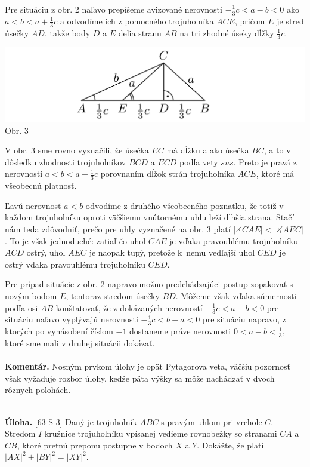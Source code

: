 \documentclass[11pt,a4paper,oneside,final]{book}
\newcommand{\kom}{\textbf{Komentár.} }
\newcommand{\ul}{\textbf{Úloha.} }
\newcommand{\ma}{\measuredangle}
\begin{document}
Pre situáciu z obr. 2 naľavo prepíšeme avizované nerovnosti $-\frac{1}{3}c < a - b < 0$ ako $a < b < a +\frac{1}{3}c$ a odvodíme ich z pomocného trojuholníka $ACE$, pričom $E$ je stred úsečky $AD$, takže body $D$ a $E$ delia stranu $AB$ na tri zhodné úseky dĺžky $\frac{1}{3}c$.
\begin{center}
\includegraphics{66D32}\\

Obr. 3
\end{center}
V obr. 3 sme rovno vyznačili, že úsečka $EC$ má dĺžku a ako úsečka $BC$, a to v dôsledku zhodnosti trojuholníkov $BCD$ a $ECD$ podľa vety $sus$. Preto je pravá z nerovností $a < b < a +\frac{1}{3}c$ porovnaním dĺžok strán trojuholníka $ACE$, ktoré má všeobecnú platnosť.

Ľavú nerovnosť $a < b$ odvodíme z druhého všeobecného poznatku, že totiž v každom trojuholníku oproti väčšiemu vnútornému uhlu leží dlhšia strana. Stačí nám teda zdôvodniť, prečo pre uhly vyznačené na obr. 3 platí $|\ma CAE| < |\ma AEC|$. To je však jednoduché: zatiaľ čo uhol $CAE$ je vďaka pravouhlému trojuholníku $ACD$ ostrý, uhol $AEC$ je naopak tupý, pretože k~nemu vedľajší uhol $CED$ je ostrý vďaka pravouhlému trojuholníku $CED$.

Pre prípad situácie z obr. 2 napravo možno predchádzajúci postup zopakovať s novým bodom $E$, tentoraz stredom úsečky $BD$. Môžeme však vďaka súmernosti podľa osi $AB$ konštatovať, že z dokázaných nerovností $-\frac{1}{3}c < a - b < 0$ pre situáciu naľavo vyplývajú nerovnosti $-\frac{1}{3}c < b - a < 0$ pre situáciu napravo, z ktorých po vynásobení číslom $-1$ dostaneme práve nerovnosti $0 < a - b <\frac{1}{3}$, ktoré sme mali v druhej situácii dokázať.\\
\\
\kom Nosným prvkom úlohy je opäť Pytagorova veta, väčšiu pozornosť však vyžaduje rozbor úlohy, keďže päta výšky sa môže nachádzať v dvoch rôznych polohách.\\
\\
\begin{tcolorbox}[breakable,notitle,boxrule=0pt,colback=light-gray,colframe=light-gray]\ul [63-S-3]
Daný je trojuholník $ABC$ s pravým uhlom pri vrchole $C$. Stredom $I$ kružnice trojuholníku vpísanej vedieme rovnobežky so stranami $CA$ a $CB$, ktoré pretnú preponu postupne v bodoch $X$ a $Y$. Dokážte, že platí $|AX|^2 + |BY |^2 = |XY |^2$.

\end{tcolorbox}
\end{document}
